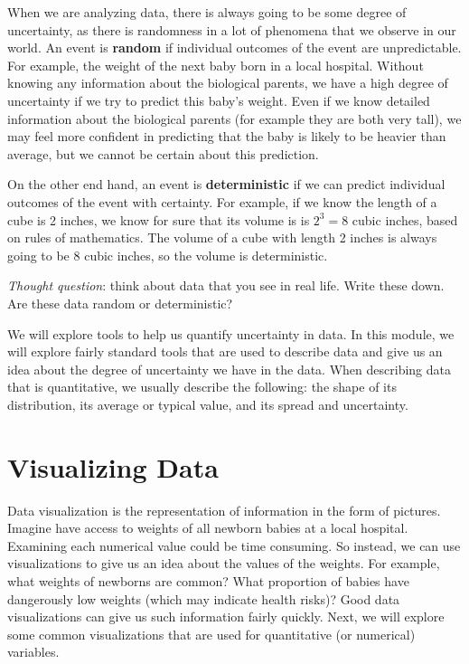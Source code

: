 \documentclass[
]{book}
\begin{document}
When we are analyzing data, there is always going to be some degree of uncertainty, as there is randomness in a lot of phenomena that we observe in our world. An event is \textbf{random} if individual outcomes of the event are unpredictable. For example, the weight of the next baby born in a local hospital. Without knowing any information about the biological parents, we have a high degree of uncertainty if we try to predict this baby's weight. Even if we know detailed information about the biological parents (for example they are both very tall), we may feel more confident in predicting that the baby is likely to be heavier than average, but we cannot be certain about this prediction.

On the other end hand, an event is \textbf{deterministic} if we can predict individual outcomes of the event with certainty. For example, if we know the length of a cube is 2 inches, we know for sure that its volume is is \(2^3 = 8\) cubic inches, based on rules of mathematics. The volume of a cube with length 2 inches is always going to be 8 cubic inches, so the volume is deterministic.

\emph{Thought question}: think about data that you see in real life. Write these down. Are these data random or deterministic?

We will explore tools to help us quantify uncertainty in data. In this module, we will explore fairly standard tools that are used to describe data and give us an idea about the degree of uncertainty we have in the data. When describing data that is quantitative, we usually describe the following: the shape of its distribution, its average or typical value, and its spread and uncertainty.

\section{Visualizing Data}\label{visualizing-data}

Data visualization is the representation of information in the form of pictures. Imagine have access to weights of all newborn babies at a local hospital. Examining each numerical value could be time consuming. So instead, we can use visualizations to give us an idea about the values of the weights. For example, what weights of newborns are common? What proportion of babies have dangerously low weights (which may indicate health risks)? Good data visualizations can give us such information fairly quickly. Next, we will explore some common visualizations that are used for quantitative (or numerical) variables.
\end{document}

